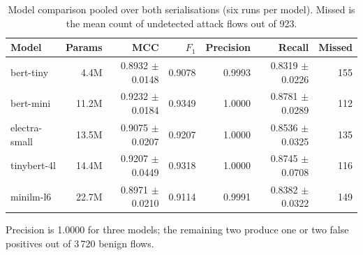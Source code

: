 \begin{table}[htbp]
\centering
\caption{Model comparison pooled over both serialisations (six runs per model). Missed is the mean count of undetected attack flows out of 923.}
\label{tab:combined-ranking}
\small
\begin{tabular}{lrrrrrr}
\toprule
Model & Params & MCC & $F_1$ & Precision & Recall & Missed \\
\midrule
bert-tiny & 4.4M & 0.8932 $\pm$ 0.0148 & 0.9078 & 0.9993 & 0.8319 $\pm$ 0.0226 & 155 \\
bert-mini & 11.2M & 0.9232 $\pm$ 0.0184 & 0.9349 & 1.0000 & 0.8781 $\pm$ 0.0289 & 112 \\
electra-small & 13.5M & 0.9075 $\pm$ 0.0207 & 0.9207 & 1.0000 & 0.8536 $\pm$ 0.0325 & 135 \\
tinybert-4l & 14.4M & 0.9207 $\pm$ 0.0449 & 0.9318 & 1.0000 & 0.8745 $\pm$ 0.0708 & 116 \\
minilm-l6 & 22.7M & 0.8971 $\pm$ 0.0210 & 0.9114 & 0.9991 & 0.8382 $\pm$ 0.0322 & 149 \\
\bottomrule
\end{tabular}
\vspace{2pt}
\footnotesize Precision is 1.0000 for three models; the remaining two produce one or two false positives out of 3\,720 benign flows.
\end{table}
